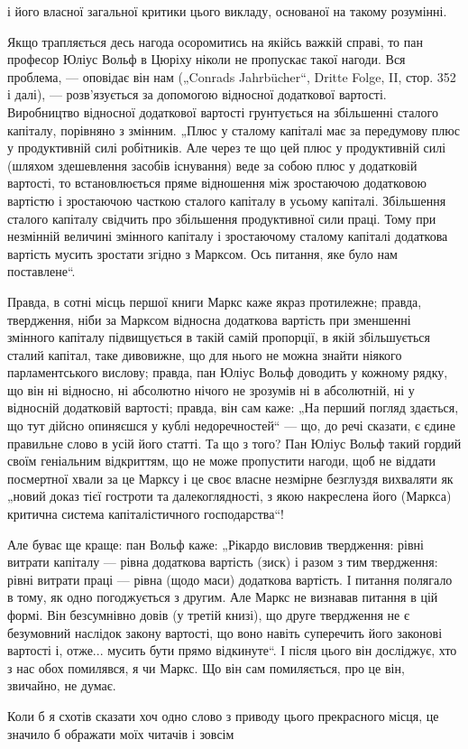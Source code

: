 \parcont{}  %
і його власної загальної критики цього викладу, основаної на
такому розумінні.

Якщо трапляється десь нагода осоромитись на якійсь важкій
справі, то пан професор Юліус Вольф в Цюріху ніколи не пропускає
такої нагоди. Вся проблема, — оповідає він нам („Conrads
Jahrbücher“, Dritte Folge, II, стор. 352 і далі), — розв’язується за допомогою
відносної додаткової вартості. Виробництво відносної
додаткової вартості грунтується на збільшенні сталого капіталу,
порівняно з змінним. „Плюс у сталому капіталі має за передумову
плюс у продуктивній силі робітників. Але через те що цей
плюс у продуктивній силі (шляхом здешевлення засобів існування)
веде за собою плюс у додатковій вартості, то встановлюється
пряме відношення між зростаючою додатковою вартістю
і зростаючою часткою сталого капіталу в усьому капіталі.
Збільшення сталого капіталу свідчить про збільшення
продуктивної сили праці. Тому при незмінній величині змінного
капіталу і зростаючому сталому капіталі додаткова вартість
мусить зростати згідно з Марксом. Ось питання, яке було нам
поставлене“.

Правда, в сотні місць першої книги Маркс каже якраз протилежне;
правда, твердження, ніби за Марксом відносна додаткова
вартість при зменшенні змінного капіталу підвищується в такій
самій пропорції, в якій збільшується сталий капітал, таке дивовижне,
що для нього не можна знайти ніякого парламентського
вислову; правда, пан Юліус Вольф доводить у кожному рядку,
що він ні відносно, ні абсолютно нічого не зрозумів ні в абсолютній,
ні у відносній додатковій вартості; правда, він сам
каже: „На перший погляд здається, що тут дійсно опиняєшся
у кублі недоречностей“ — що, до речі сказати, є єдине правильне
слово в усій його статті. Та що з того? Пан Юліус
Вольф такий гордий своїм геніальним відкриттям, що не може
пропустити нагоди, щоб не віддати посмертної хвали за це
Марксу і це своє власне незмірне безглуздя вихваляти як „новий
доказ тієї гостроти та далекоглядності, з якою накреслена
його (Маркса) критична система капіталістичного господарства“!

Але буває ще краще: пан Вольф каже: „Рікардо висловив
твердження: рівні витрати капіталу — рівна додаткова вартість
(зиск) і разом з тим твердження: рівні витрати праці — рівна
(щодо маси) додаткова вартість. І питання полягало в тому,
як одно погоджується з другим. Але Маркс не визнавав питання
в цій формі. Він безсумнівно довів (у третій книзі),
що друге твердження не є безумовний наслідок закону вартості,
що воно навіть суперечить його законові вартості і, отже...
мусить бути прямо відкинуте“. І після цього він досліджує, хто
з нас обох помилявся, я чи Маркс. Що він сам помиляється,
про це він, звичайно, не думає.

Коли б я схотів сказати хоч одно слово з приводу цього
прекрасного місця, це значило б ображати моїх читачів і зовсім
\parbreak{}  %
